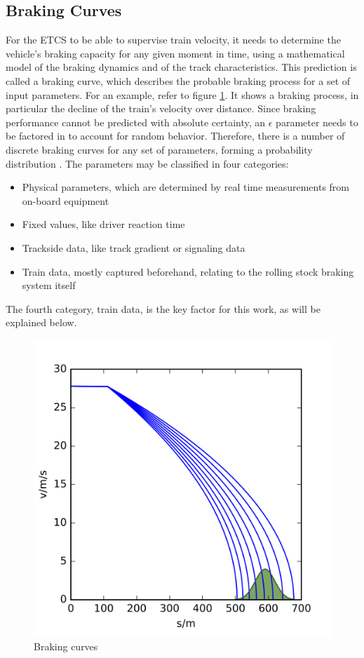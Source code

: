 \subsection{Braking Curves}
\label{sec:BrakingCurves}
\par\noindent
For the ETCS to be able to supervise train velocity, it needs to determine the vehicle's braking capacity for any given moment in time, using a mathematical model of the braking dynamics and of the track characteristics. This prediction is called a braking curve, which describes the probable braking process for a set of input parameters. For an example, refer to figure \ref{fig:brakingcurves}. It shows a braking process, in particular the decline of the train's velocity over distance. Since braking performance cannot be predicted with absolute certainty, an $\epsilon$ parameter needs to be factored in to account for random behavior. Therefore, there is a number of discrete braking curves for any set of parameters, forming a probability distribution \cite{Pfaff2017}. The parameters may be classified in four categories:
\begin{itemize}
	\item Physical parameters, which are determined by real time measurements from on-board equipment
	\item Fixed values, like driver reaction time
	\item Trackside data, like track gradient or signaling data
	\item Train data, mostly captured beforehand, relating to the rolling stock braking system itself
\end{itemize}
The fourth category, train data, is the key factor for this work, as will be explained below.

\begin{figure}[htb!]
	\centering
	\includegraphics[scale=0.2]{./pic/171026_Transrail_BrakingCurves-14}
	\caption{Braking curves \cite{Pfaff2017}}
	\label{fig:brakingcurves}
\end{figure}

